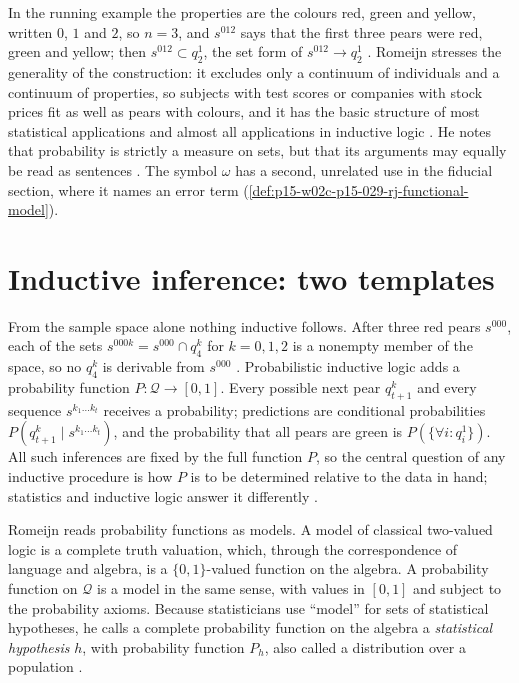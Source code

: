 In the running example the properties are the colours red, green and
yellow, written \(0\), \(1\) and \(2\), so \(n=3\), and \(s^{012}\) says
that the first three pears were red, green and yellow; then
\(s^{012}\subset q^1_2\), the set form of \(s^{012}\to q^1_2\)
\cite[p.~627]{Romeijn2011InductiveLogicStatistics}. Romeijn stresses
the generality of the construction: it excludes only a continuum of
individuals and a continuum of properties, so subjects with test scores
or companies with stock prices fit as well as pears with colours, and
it has the basic structure of most statistical applications and almost
all applications in inductive logic \cite[pp.~627--628]{Romeijn2011InductiveLogicStatistics}.
He notes that probability is strictly a measure on sets, but that its
arguments may equally be read as sentences
\cite[p.~627]{Romeijn2011InductiveLogicStatistics}. The symbol
\(\omega\) has a second, unrelated use in the fiducial section, where it
names an error term (\cref{def:p15-w02c-p15-029-rj-functional-model}).

\section{Inductive inference: two templates}
\label{sec:p15-w02c-p15-029-rj-inference}

From the sample space alone nothing inductive follows. After three red
pears \(s^{000}\), each of the sets \(s^{000k}=s^{000}\cap q^k_4\) for
\(k=0,1,2\) is a nonempty member of the space, so no \(q^k_4\) is
derivable from \(s^{000}\) \cite[p.~628]{Romeijn2011InductiveLogicStatistics}.
Probabilistic inductive logic adds a probability function
\(P:\mathcal Q\to[0,1]\). Every possible next pear \(q^k_{t+1}\) and
every sequence \(s^{k_1\ldots k_t}\) receives a probability; predictions
are conditional probabilities \(P(q^k_{t+1}\mid s^{k_1\ldots k_t})\), and
the probability that all pears are green is \(P(\{\forall i:q^1_i\})\).
All such inferences are fixed by the full function \(P\), so the central
question of any inductive procedure is how \(P\) is to be determined
relative to the data in hand; statistics and inductive logic answer it
differently \cite[p.~628]{Romeijn2011InductiveLogicStatistics}.

Romeijn reads probability functions as models. A model of classical
two-valued logic is a complete truth valuation, which, through the
correspondence of language and algebra, is a \(\{0,1\}\)-valued function
on the algebra. A probability function on \(\mathcal Q\) is a model in
the same sense, with values in \([0,1]\) and subject to the probability
axioms. Because statisticians use ``model'' for sets of statistical
hypotheses, he calls a complete probability function on the algebra a
\emph{statistical hypothesis} \(h\), with probability function \(P_h\),
also called a distribution over a population
\cite[pp.~628--629]{Romeijn2011InductiveLogicStatistics}.

